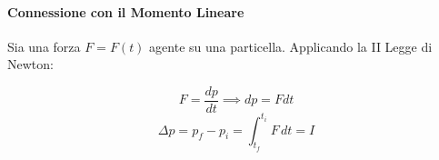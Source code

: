         \paragraph{Connessione con il Momento Lineare} Sia una forza $F = F(t)$
        agente su una particella. Applicando la II Legge di Newton:

        \begin{equation*}
            F = \frac{dp}{dt} \implies dp = F dt
        \end{equation*}
        \begin{equation*}
            \Delta p = p_f - p_i = \int_{t_f}^{t_i} F \,dt = I 
        \end{equation*}
    